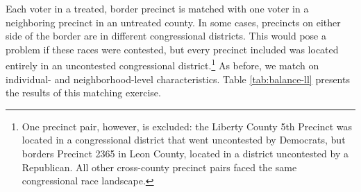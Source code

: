 \documentclass[
  12pt,
]{article}
\begin{document}
Each voter in a treated, border precinct is matched with one voter in a neighboring precinct in an untreated county. In some cases, precincts on either side of the border are in different congressional districts. This would pose a problem if these races were contested, but every precinct included was located entirely in an uncontested congressional district.\footnote{One precinct pair, however, is excluded: the Liberty County 5th Precinct was located in a congressional district that went uncontested by Democrats, but borders Precinct 2365 in Leon County, located in a district uncontested by a Republican. All other cross-county precinct pairs faced the same congressional race landscape.} As before, we match on individual- and neighborhood-level characteristics. Table \ref{tab:balance-ll} presents the results of this matching exercise.

\begin{singlespace}
\begin{table}[H]

\caption{\label{tab:balance-tab-ll}\label{tab:balance-ll} Balance Table for Border Precinct Matching}
\centering
{}
\end{table}
\end{singlespace}
\end{document}

